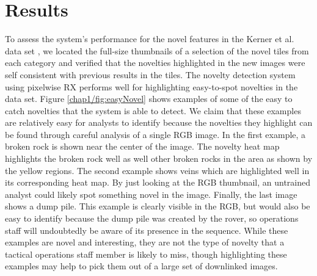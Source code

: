 \section{Results}
To assess the system's performance for the novel features in the Kerner et al. data set \cite{kerner_data}, we located the full-size thumbnails of a selection of the novel tiles from each category and verified that the novelties highlighted in the new images were self consistent with previous results in the tiles. 
The novelty detection system using pixelwise RX performs well for highlighting easy-to-spot novelties in the data set. 
Figure \ref{chap1/fig:easyNovel} shows examples of some of the easy to catch novelties that the system is able to detect. 
We claim that these examples are relatively easy for analysts to identify because the novelties they highlight can be found through careful analysis of a single RGB image.
In the first example, a broken rock is shown near the center of the image.
The novelty heat map highlights the broken rock well as well other broken rocks in the area as shown by the yellow regions.
The second example shows veins which are highlighted well in its corresponding heat map. 
By just looking at the RGB thumbnail, an untrained analyst could likely spot something novel in the image. 
Finally, the last image shows a dump pile.
This example is clearly visible in the RGB, but would also be easy to identify because the dump pile was created by the rover, so operations staff will undoubtedly be aware of its presence in the sequence. 
While these examples are novel and interesting, they are not the type of novelty that a tactical operations staff member is likely to miss, though highlighting these examples may help to pick them out of a large set of downlinked images. 

